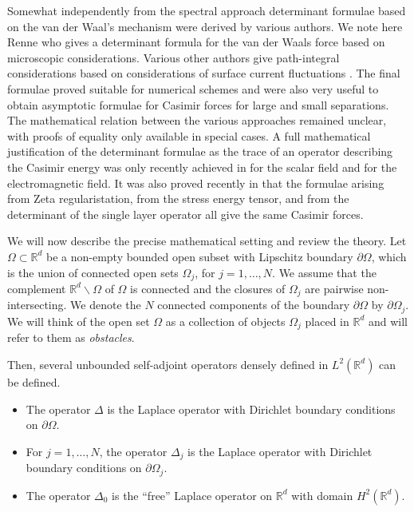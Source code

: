 Somewhat independently from the spectral approach determinant formulae based on the van der Waal's mechanism were derived by various authors. 
We note here Renne \cite{renne1971microscopic} who gives a determinant formula for the van der Waals force based on microscopic considerations. Various other authors 
give path-integral considerations based on considerations of surface current fluctuations 
\cite{bimonte2017nonequilibrium, emig2007casimir, emig2006casimir, EGJK2008, emig2008casimir, kenneth2006opposites, kenneth2008casimir, milton2008multiple, rahi2009scattering}. The final formulae proved suitable for numerical schemes 
and were also very useful to obtain asymptotic formulae for Casimir forces for large and small separations. The mathematical relation between the various 
approaches remained unclear, with proofs of equality only available in special cases.
A full mathematical justification of the determinant formulae as the trace of an operator describing the Casimir energy was only recently achieved in 
\cite{MR4484208} for the scalar field and \cite{strohmaier2021classical} for the electromagnetic field. It was also proved recently in \cite{fang2021mathematical} that the 
formulae arising from Zeta regularistation, from the stress energy tensor, and from the determinant of the single layer operator all give the same Casimir forces.

We will now describe the precise mathematical setting and review the theory.
Let $\Omega \subset \mathbb{R}^{d}$ be a non-empty bounded open subset with Lipschitz boundary $\partial \Omega$, which is the union of connected open 
sets $\Omega_{j}$, for $j = 1, \dots, N$. We assume that the complement $\mathbb{R}^{d} \backslash \Omega$ of $\Omega$ is connected and the closures of $\Omega_{j}$ 
are pairwise non-intersecting.
We denote the  $N$ connected components of the boundary $\partial\Omega$ by $\partial\Omega_{j}$. 
We will think of the open set $\Omega$ as a collection of objects $\Omega_{j}$ placed in $\mathbb{R}^{d}$ and will refer to them as {\sl obstacles}.

Then, several unbounded self-adjoint operators densely defined in $L^{2}(\mathbb{R}^{d})$
can be defined.
\begin{itemize}
    \item The operator $\Delta$ is the Laplace operator with Dirichlet boundary conditions on $\partial\Omega$.
    \item For $j = 1, \dots, N$, the operator $\Delta_{j}$ is the Laplace operator with Dirichlet boundary conditions on $\partial\Omega_{j}$.
    \item The operator $\Delta_{0}$ is the ``free'' Laplace operator on $\mathbb{R}^{d}$ with domain $H^{2}(\mathbb{R}^{d})$.
\end{itemize}

